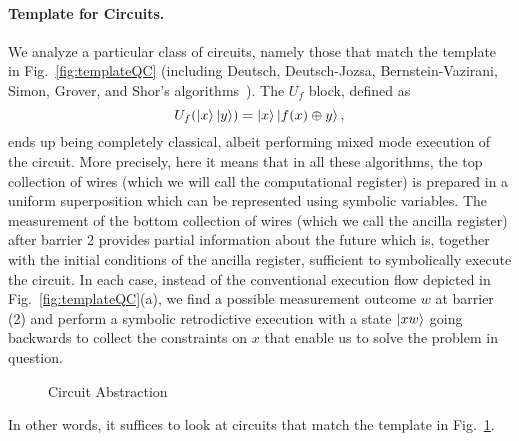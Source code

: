 \documentclass[sigplan,review]{acmart}
\theoremstyle{definition}
\begin{document}
\paragraph*{Template for Circuits.}
 We analyze a particular class of circuits, namely those
that match the template in Fig.~\ref{fig:templateQC} (including
Deutsch, Deutsch-Jozsa, Bernstein-Vazirani, Simon, Grover, and Shor's
algorithms~\cite{doi:10.1137/S0097539796300921,deutsch,deutschJozsa,365701,doi:10.1137/S0097539795293172,nielsen_chuang_2010,10.1145/237814.237866}). 
The $U_f$ block, defined as 
\begin{equation}
  U_f(\ket{x}\ket{y}) = \ket{x}\ket{f(x) \oplus y},
\end{equation}
ends up being completely classical, albeit performing mixed mode
execution of the circuit. More precisely, here it means that in
all these algorithms, the top collection of wires (which we will call
the computational register) is prepared in a uniform superposition
which can be represented using symbolic variables. The measurement of
the bottom collection of wires (which we call the ancilla register)
after barrier 2 provides partial information about the future which
is, together with the initial conditions of the ancilla register,
sufficient to symbolically execute the circuit. In each case, instead
of the conventional execution flow depicted in
Fig.~\ref{fig:templateQC}(a), we find a possible measurement outcome
$w$ at barrier (2) and perform a symbolic retrodictive execution with
a state $\ket{xw}$ going backwards to collect the constraints on $x$
that enable us to solve the problem in question.

\begin{figure}[t]
\caption{\label{fig:CircuitAbstraction}Circuit Abstraction}
\end{figure}

In other words, it suffices to look at circuits that match the
template in Fig.~\ref{fig:CircuitAbstraction}.
\end{document}
